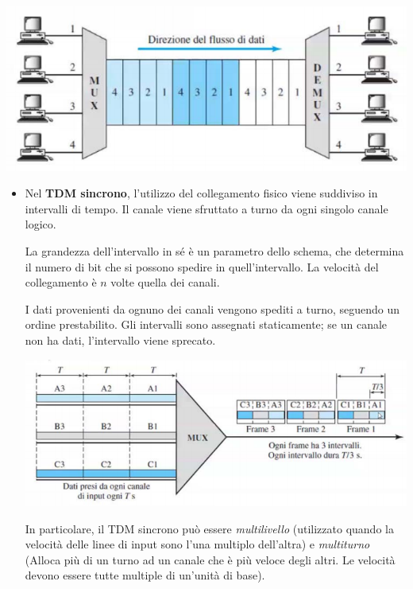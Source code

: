 \begin{itemize}
                \begin{center}
                    \includegraphics[scale=0.6]{images/TDM.png}
                \end{center}
                
                \begin{itemize}
                    \item 
                        Nel \textbf{TDM sincrono}, l'utilizzo del collegamento fisico viene suddiviso in intervalli di tempo. Il canale viene sfruttato a turno da ogni singolo canale logico. 
                        
                        La grandezza dell'intervallo in sé è un parametro dello schema, che determina il numero di bit che si possono spedire in quell'intervallo. La velocità del collegamento è $n$ volte quella dei canali. 
                        
                        I dati provenienti da ognuno dei canali vengono spediti a turno, seguendo un ordine prestabilito. Gli intervalli sono assegnati staticamente; se un canale non ha dati, l'intervallo viene sprecato.
                    
                        \begin{center}
                            \includegraphics[scale=0.6]{images/TDM_Sincrono.png}
                        \end{center}
                    
                        In particolare, il TDM sincrono può essere \textit{multilivello} (utilizzato quando la velocità delle linee di input sono l'una multiplo dell'altra) e \textit{multiturno} (Alloca più di un turno ad un canale che è più veloce degli altri. Le velocità devono essere tutte multiple di un'unità di base).
                        

\end{itemize}
\end{itemize}
